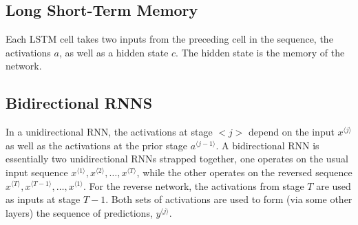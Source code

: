 \documentclass{article}
\begin{document}
\subsection{Long Short-Term Memory}

Each LSTM cell takes two inputs from the preceding cell in the sequence, the activations $a$, as well as a hidden state $c$. The hidden state is the memory of the network.

\subsection{Bidirectional RNNS}

In a unidirectional RNN, the activations at stage $<j>$ depend on the input $x^{\langle j \rangle}$ as well as the activations at the prior stage $a^{\langle j-1 \rangle}$. A bidirectional RNN is essentially two unidirectional RNNs strapped together, one operates on the usual input sequence $x^{\langle 1 \rangle}, x^{\langle 2 \rangle}, \ldots,  x^{\langle T \rangle} $, while the other operates on the reversed sequence $x^{\langle T \rangle}, x^{\langle T-1 \rangle}, \ldots,  x^{\langle 1 \rangle} $. For the reverse network, the activations from stage $T$ are used as inputs at stage $T-1$. Both sets of activations are used to form (via some other layers) the sequence of predictions, $y^{\langle j \rangle}$.
\end{document}
